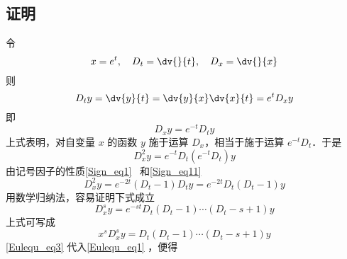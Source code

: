 \subsection{证明}
令
\begin{equation}
x=e^t,\quad D_t=\dv{}{t},\quad D_x=\dv{}{x}
\end{equation}
则
\begin{equation}
D_ty=\dv{y}{t}=\dv{y}{x}\dv{x}{t}=e^tD_xy
\end{equation}
即
\begin{equation}
D_xy=e^{-t}D_ty
\end{equation}
上式表明，对自变量 $x$ 的函数 $y$ 施于运算 $D_x$，相当于施于运算 $e^{-t}D_t$．于是
\begin{equation}
D_x^2y=e^{-t}D_t(e^{-t}D_t)y
\end{equation}
由记号因子的性质\autoref{Sign_eq1}~ 和\autoref{Sign_eq11}~
\begin{equation}
D_x^2y=e^{-2t}(D_t-1)D_ty=e^{-2t}D_t(D_t-1)y
\end{equation}
用数学归纳法，容易证明下式成立
\begin{equation}
D_x^sy=e^{-st}D_t(D_t-1)\cdots (D_t-s+1)y
\end{equation}
上式可写成
\begin{equation}\label{Eulequ_eq3}
x^sD_x^sy=D_t(D_t-1)\cdots (D_t-s+1)y
\end{equation}
\autoref{Eulequ_eq3} 代入\autoref{Eulequ_eq1} ，便得
